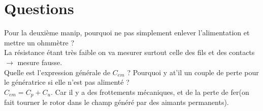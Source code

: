 \documentclass[12pt,prb,aps,epsf]{article}
\begin{document}
\section*{Questions}
Pour la deuxième manip, pourquoi ne pas simplement enlever l'alimentation et mettre un ohmmètre ?\\
La résistance étant très faible on va mesurer surtout celle des fils et des contacts $\rightarrow$ mesure fausse.\\

Quelle est l'expression générale de $C_{em}$ ? Pourquoi y at'il un couple de perte pour le génératrice si elle n'est pas alimenté ?\\
$C_{em} = C_p + C_u$. Car il y a des frottements mécaniques, et de la perte de fer(on fait tourner le rotor dans le champ généré par des aimants permanents).
\end{document}
